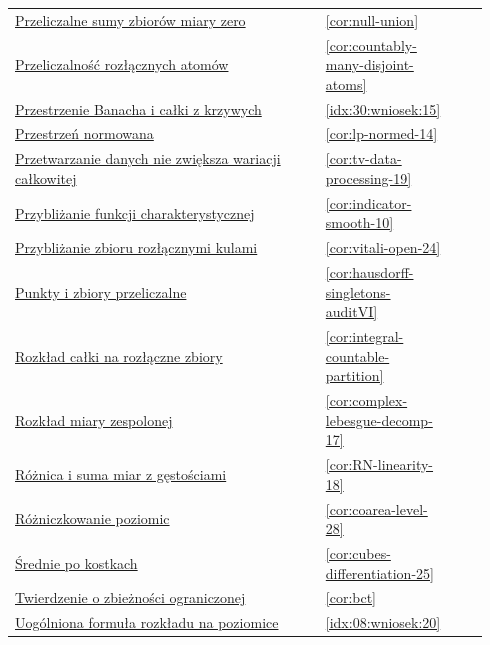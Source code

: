 \documentclass[11pt,a4paper,oneside]{book}
\numberwithin{equation}{chapter}
\theoremstyle{plain}
\theoremstyle{definition}
\theoremstyle{remark}
\begin{document}
\begin{longtable}{@{}p{0.72\linewidth}p{0.135\linewidth}p{0.08\linewidth}@{}}
\hyperref[cor:null-union]{Przeliczalne sumy zbiorów miary zero} & \ref*{cor:null-union} & \pageref*{cor:null-union} \\
\hyperref[cor:countably-many-disjoint-atoms]{Przeliczalność rozłącznych atomów} & \ref*{cor:countably-many-disjoint-atoms} & \pageref*{cor:countably-many-disjoint-atoms} \\
\hyperref[idx:30:wniosek:15]{Przestrzenie Banacha i całki z krzywych} & \ref*{idx:30:wniosek:15} & \pageref*{idx:30:wniosek:15} \\
\hyperref[cor:lp-normed-14]{Przestrzeń normowana} & \ref*{cor:lp-normed-14} & \pageref*{cor:lp-normed-14} \\
\hyperref[cor:tv-data-processing-19]{Przetwarzanie danych nie zwiększa wariacji całkowitej} & \ref*{cor:tv-data-processing-19} & \pageref*{cor:tv-data-processing-19} \\
\hyperref[cor:indicator-smooth-10]{Przybliżanie funkcji charakterystycznej} & \ref*{cor:indicator-smooth-10} & \pageref*{cor:indicator-smooth-10} \\
\hyperref[cor:vitali-open-24]{Przybliżanie zbioru rozłącznymi kulami} & \ref*{cor:vitali-open-24} & \pageref*{cor:vitali-open-24} \\
\hyperref[cor:hausdorff-singletons-auditVI]{Punkty i zbiory przeliczalne} & \ref*{cor:hausdorff-singletons-auditVI} & \pageref*{cor:hausdorff-singletons-auditVI} \\
\hyperref[cor:integral-countable-partition]{Rozkład całki na rozłączne zbiory} & \ref*{cor:integral-countable-partition} & \pageref*{cor:integral-countable-partition} \\
\hyperref[cor:complex-lebesgue-decomp-17]{Rozkład miary zespolonej} & \ref*{cor:complex-lebesgue-decomp-17} & \pageref*{cor:complex-lebesgue-decomp-17} \\
\hyperref[cor:RN-linearity-18]{Różnica i suma miar z gęstościami} & \ref*{cor:RN-linearity-18} & \pageref*{cor:RN-linearity-18} \\
\hyperref[cor:coarea-level-28]{Różniczkowanie poziomic} & \ref*{cor:coarea-level-28} & \pageref*{cor:coarea-level-28} \\
\hyperref[cor:cubes-differentiation-25]{Średnie po kostkach} & \ref*{cor:cubes-differentiation-25} & \pageref*{cor:cubes-differentiation-25} \\
\hyperref[cor:bct]{Twierdzenie o zbieżności ograniczonej} & \ref*{cor:bct} & \pageref*{cor:bct} \\
\hyperref[idx:08:wniosek:20]{Uogólniona formuła rozkładu na poziomice} & \ref*{idx:08:wniosek:20} & \pageref*{idx:08:wniosek:20} \\

\end{longtable}
\end{document}
